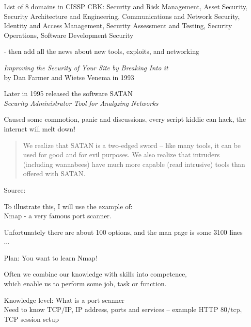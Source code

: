 \documentclass[Screen16to9,17pt]{foils}
\begin{document}
List of 8 domains in CISSP CBK: Security and Risk Management, Asset Security,
Security Architecture and Engineering, Communications and Network Security, Identity and Access Management, Security Assessment and Testing, Security Operations, Software Development Security

- then add all the news about new tools, exploits, and networking




\begin{list1}
\item \emph{Improving the Security of Your Site by Breaking Into it}\\ by
Dan Farmer and Wietse Venema in 1993
\item Later in 1995 released the software SATAN\\
\emph{Security Administrator Tool for Analyzing Networks}
\item Caused some commotion, panic and discussions, every script kiddie can hack, the internet will melt down!
\vskip 5mm
\begin{quote}
We realize that SATAN is a two-edged sword -- like
many tools, it can be used for good and for evil
purposes. We also realize that intruders (including
wannabees) have much more capable (read intrusive)
tools than offered with SATAN.
\end{quote}
\end{list1}

\vskip 1cm
Source:




To illustrate this, I will use the example of:\\
Nmap - a very famous port scanner.

Unfortunately there are about 100 options, and the man page is some 3100 lines ...


Plan: You want to learn Nmap!

{\large Often we combine our knowledge with skills into competence, \\
which enable us to perform some job, task or function.}

\begin{list2}
\item Knowledge level: What is a port scanner\\
Need to know TCP/IP, IP address, ports and services -- example HTTP 80/tcp, TCP session setup
\end{list2}
\end{document}
